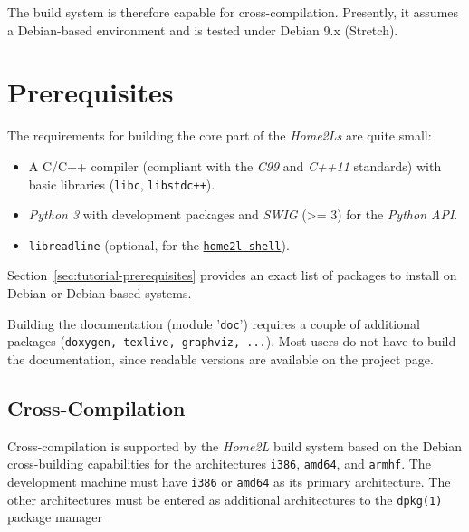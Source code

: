 \documentclass[12pt,english,parskip=half]{scrreprt}
\newcommand{\idx}[1]{#1\index{#1}}
\newcommand{\toolref}[1]{\hyperref[tool:#1]{\texttt{\idx{#1}}}}
\begin{document}
The build system is therefore capable for cross-compilation. Presently,
it assumes a Debian-based environment and is tested under Debian 9.x
(Stretch).





\section{Prerequisites}
\label{sec:installing-prerequisites}


The requirements for building the core part of the \emph{Home2Ls} are
quite small:

\begin{itemize}
\item
  A C/C++ compiler (compliant with the \emph{C99} and \emph{C++11} standards)
  with basic libraries (\texttt{libc}, \texttt{libstdc++}).
\item
  \emph{Python 3} with development packages and \emph{SWIG}
  (\textgreater{}= 3) for the \emph{Python API}.
\item
  \texttt{libreadline} (optional, for the \toolref{home2l-shell}).
\end{itemize}

Section~\ref{sec:tutorial-prerequisites} provides an exact list of
packages to install on Debian or Debian-based systems.

Building the documentation (module '\texttt{doc}') requires a couple
of additional packages (\texttt{doxygen, texlive, graphviz, ...}).
Most users do not have to build the documentation, since readable
versions are available on the project page.



\subsection{Cross-Compilation}
\label{sec:installing-cross}


Cross-compilation is supported by the \emph{Home2L} build system based
on the Debian cross-building capabilities for the architectures
\texttt{i386}, \texttt{amd64}, and \texttt{armhf}. The
development machine must have \texttt{i386} or \texttt{amd64} as
its primary architecture. The other architectures must be entered as
additional architectures to the \texttt{dpkg(1)} package manager
\end{document}
